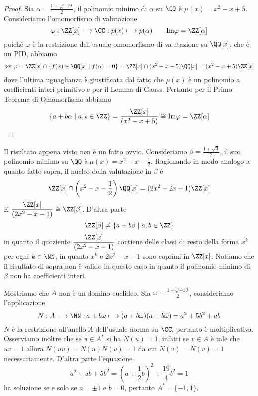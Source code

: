 \documentclass[11pt]{scrartcl}
\begin{document}
	\begin{proof}
		Sia $\alpha = \displaystyle\frac{1 + \sqrt{-19}}{2}$, il polinomio minimo di $\alpha$
		su $\QQ$ è $\mu(x) = x^2 - x + 5$. Consideriamo l'omomorfismo di valutazione
		\[
		\varphi: \ZZ[x]\longrightarrow \CC: p(x) \longmapsto p(\alpha) 
		\qquad \mathrm{Im\varphi} = \ZZ[\alpha]
		\]
		poiché $\varphi$ è la restrizione dell'usuale omomorfismo di valutazione
		su $\QQ[x]$, che è un PID, abbiamo
		\begin{multline*}
			\ker \varphi = \ZZ[x] \cap \{f(x) \in \QQ[x]\mid f(\alpha) = 0\}
			= \ZZ[x] \cap (x^2 - x + 5)\QQ[x] = (x^2 - x + 5)\ZZ[x]
		\end{multline*}
		dove l'ultima uguaglianza è giustificata dal fatto che $\mu(x)$ è un 
		polinomio a coefficienti interi primitivo e per il Lemma di Gauss.
		Pertanto per il Primo Teorema di Omomorfismo abbiamo 
		\[
		\{a + b\alpha \mid a, b \in \ZZ\} = \frac{\ZZ[x]}{(x^2 - x + 5)} \cong \mathrm{Im\varphi} = 
		\ZZ[\alpha]
		\]
	\end{proof}
	
	\begin{remark}
		Il risultato appena visto non è un fatto ovvio. Consideriamo $\beta = 
		\displaystyle\frac{1 + \sqrt{3}}{2}$,
		il suo polinomio minimo su $\QQ$ è $\displaystyle\mu(x) = x^2 - x - \frac 1 2$.
		Ragionando in modo analogo a quanto fatto sopra, il nucleo della valutazione
		in $\beta$ è 
		\[
		\ZZ[x] \cap \left(x^2 - x - \frac 1 2\right)\QQ[x] =(2x^2 - 2x - 1)\ZZ[x]
		\]
		E $\displaystyle\frac{\ZZ[x]}{(2x^2 - x - 1)} \cong \ZZ[\beta]$.
		D'altra parte 
		\[
		\ZZ[\beta] \neq \{a + b\beta\mid a, b \in \ZZ\}
		\]
		in quanto il quoziente $\displaystyle\frac{\ZZ[x]}{(2x^2 - x - 1)}$
		contiene delle classi di resto della forma $\overline{x^k}$ per ogni $k \in \NN$,
		in quanto $x^k$ e $2x^2 - x - 1$ sono coprimi in $\ZZ[x]$. Notiamo che
		il risultato di sopra non è valido in questo caso in quanto il polinomio
		minimo di $\beta$ non ha coefficienti interi.
	\end{remark}
	
	Mostriamo che $A$ non è un domino euclideo. Sia $\omega = 
	\displaystyle\frac{1 + \sqrt{-19}}{2}$, consideriamo l'applicazione
	\[
	N: A \longrightarrow \NN: a + b\omega \longmapsto (a + b\omega)(a + b\overline{\omega}) =
	a^2 + 5b^2 + ab
	\]
	$N$ è la restrizione all'anello $A$ dell'usuale norma su $\CC$,
	pertanto è moltiplicativa. Osserviamo inoltre che se $u \in A^*$ si ha 
	$N(u)= 1$, infatti se $v \in A$ è tale che $uv = 1$ allora $N(uv) = N(u)N(v) = 1$
	da cui $N(u) = N(v) = 1$ necessariamente. D'altra parte l'equazione 
	\[
	a^2 + ab + 5b^2 = \left(a + \frac 1 2 b\right)^2 + \frac{19}{4} b^2 = 1
	\]
	ha soluzione se e solo se $a = \pm 1$ e $b = 0$, pertanto $A^* = \{-1, 1\}$.
	
\end{document}
